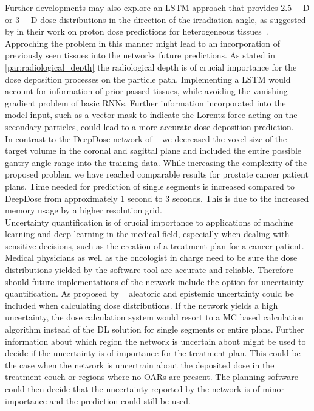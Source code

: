 Further developments may also explore an LSTM approach that provides 2.5~-~D or 3~-~D dose distributions in the direction of the irradiation angle, as suggested by \citeauthor{neishabouri_long_2020} in their work on proton dose predictions for heterogeneous tissues~\cite{neishabouri_long_2020}. 
Approching the problem in this manner might lead to an incorporation of previously seen tissues into the networks future predictions.
As stated in \autoref{par:radiological_depth} the radiological depth is of crucial importance for the dose deposition processes on the particle path.
Implementing a LSTM would account for information of prior passed tissues, while avoiding the vanishing gradient problem of basic RNNs. 
Further information incorporated into the model input, such as a vector mask to indicate the Lorentz force acting on the secondary particles, could lead to a more accurate dose deposition prediction.\\
In contrast to the DeepDose network of \citeauthor{kontaxis_deepdose_2020}~\cite{kontaxis_deepdose_2020} we decreased the voxel size of the target volume in the coronal and sagittal plane and included the entire possible gantry angle range into the training data.
While increasing the complexity of the proposed problem we have reached comparable results for prostate cancer patient plans.
Time needed for prediction of single segments is increased compared to DeepDose from approximately 1 second to 3 seconds.
This is due to the increased memory usage by a higher resolution grid.\\
Uncertainty quantification is of crucial importance to applications of machine learning and deep learning in the medical field, especially when dealing with sensitive decisions, such as the creation of a treatment plan for a cancer patient.
Medical physicians as well as the oncologist in charge need to be sure the dose distributions yielded by the software tool are accurate and reliable.
Therefore should future implementations of the network include the option for uncertainty quantification.
As proposed by \citeauthor{kendall_what_2017}~\cite{kendall_what_2017} aleatoric and epistemic uncertainty could be included when calculating dose distributions.
If the network yields a high uncertainty, the dose calculation system would resort to a \acs{MC} based calculation algorithm instead of the \acs{DL} solution for single segments or entire plans.
Further information about which region the network is uncertain about might be used to decide if the uncertainty is of importance for the treatment plan.
This could be the case when the network is uncertrain about the deposited dose in the treatment couch or regions where no \acs{OAR}s are present.
The planning software could then decide that the uncertainty reported by the network is of minor importance and the prediction could still be used.







